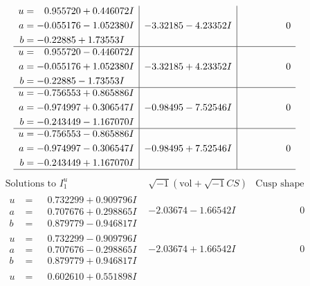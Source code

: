 \documentclass[1p]{elsarticle_modified}
\theoremstyle{definition}
\newcommand{\I}{\sqrt{-1}}
\begin{document}
$$\begin{array}{c|c|c}
\begin{aligned}
u &= \phantom{-}0.955720 + 0.446072 I \\
a &= -0.055176 - 1.052380 I \\
b &= -0.22885 + 1.73553 I\end{aligned}
 & -3.32185 - 4.23352 I & \phantom{-0.000000 } 0 \\ \hline\begin{aligned}
u &= \phantom{-}0.955720 - 0.446072 I \\
a &= -0.055176 + 1.052380 I \\
b &= -0.22885 - 1.73553 I\end{aligned}
 & -3.32185 + 4.23352 I & \phantom{-0.000000 } 0 \\ \hline\begin{aligned}
u &= -0.756553 + 0.865886 I \\
a &= -0.974997 + 0.306547 I \\
b &= -0.243449 - 1.167070 I\end{aligned}
 & -0.98495 - 7.52546 I & \phantom{-0.000000 } 0 \\ \hline\begin{aligned}
u &= -0.756553 - 0.865886 I \\
a &= -0.974997 - 0.306547 I \\
b &= -0.243449 + 1.167070 I\end{aligned}
 & -0.98495 + 7.52546 I & \phantom{-0.000000 } 0\\
 \hline 
 \end{array}$$\newpage$$\begin{array}{c|c|c}  
\text{Solutions to }I^u_{1}& \I (\text{vol} + \sqrt{-1}CS) & \text{Cusp shape}\\
 \hline 
\begin{aligned}
u &= \phantom{-}0.732299 + 0.909796 I \\
a &= \phantom{-}0.707676 + 0.298865 I \\
b &= \phantom{-}0.879779 - 0.946817 I\end{aligned}
 & -2.03674 - 1.66542 I & \phantom{-0.000000 } 0 \\ \hline\begin{aligned}
u &= \phantom{-}0.732299 - 0.909796 I \\
a &= \phantom{-}0.707676 - 0.298865 I \\
b &= \phantom{-}0.879779 + 0.946817 I\end{aligned}
 & -2.03674 + 1.66542 I & \phantom{-0.000000 } 0 \\ \hline\begin{aligned}
u &= \phantom{-}0.602610 + 0.551898 I \\

\end{aligned}
\end{array}$$
\end{document}
